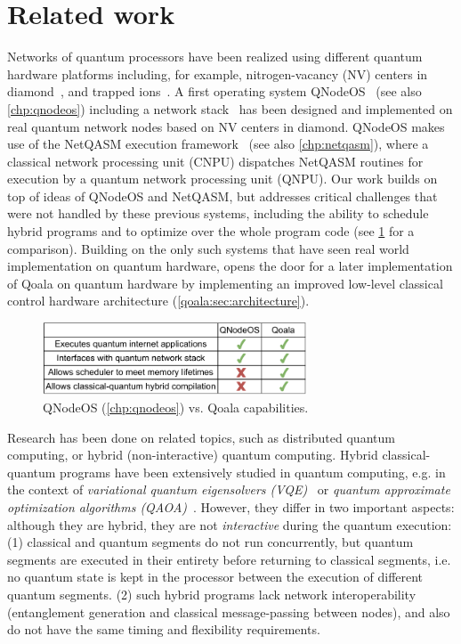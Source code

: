 \section{Related work}
\label{qoala:sec:related_work}

Networks of quantum processors have been realized using different quantum hardware platforms including, for example, nitrogen-vacancy (NV) centers in diamond~\cite{pompili2021realization}, and trapped ions~\cite{krutyanskiy2023entanglement}.
A first operating system QNodeOS~\cite{qnodeos_nature} (see also \cref{chp:qnodeos}) including a network stack~\cite{pompili2022experimental} has been designed and implemented on real quantum network nodes based on NV centers in diamond.
QNodeOS makes use of the NetQASM execution framework~\cite{dahlberg2022netqasm} (see also \cref{chp:netqasm}), where a classical network processing unit (CNPU) dispatches NetQASM routines for execution by a quantum network processing unit (QNPU).
Our work builds on top of ideas of QNodeOS and NetQASM, but addresses critical challenges that were not handled by these previous systems, including the ability to schedule hybrid programs and to optimize over the whole program code (see \cref{qoala:fig:qoala_vs_qnos} for a comparison).
Building on the only such systems that have seen real world implementation on quantum hardware, opens the door for a later implementation of Qoala on quantum hardware by implementing an improved low-level classical control hardware architecture (\cref{qoala:sec:architecture}).

\begin{figure}[t]
    \centering
    \includegraphics[width=0.7\textwidth]{figures/qoala/qoala_vs_qnos.pdf}
    \caption{
        QNodeOS (\cref{chp:qnodeos}) vs. Qoala capabilities.
    }
    \label{qoala:fig:qoala_vs_qnos}
\end{figure}

Research has been done on related topics, such as distributed quantum computing, or hybrid (non-interactive) quantum computing. Hybrid classical-quantum programs have been extensively studied in quantum computing, e.g. in the context of \textit{variational quantum eigensolvers (VQE)}~\cite{diadamo2021distributed, liu2022layer} or \textit{quantum approximate optimization algorithms (QAOA)}~\cite{farhi2014quantum}. However, they differ in two important aspects: although they are hybrid, they are not \textit{interactive} during the quantum execution:
(1) classical and quantum segments do not run concurrently, but quantum segments are executed in their entirety before returning to classical segments, i.e. no quantum state is kept in the processor between the execution of different quantum segments.
(2) such hybrid programs lack network interoperability (entanglement generation and classical message-passing between nodes), and also do not have the same timing and flexibility requirements.


